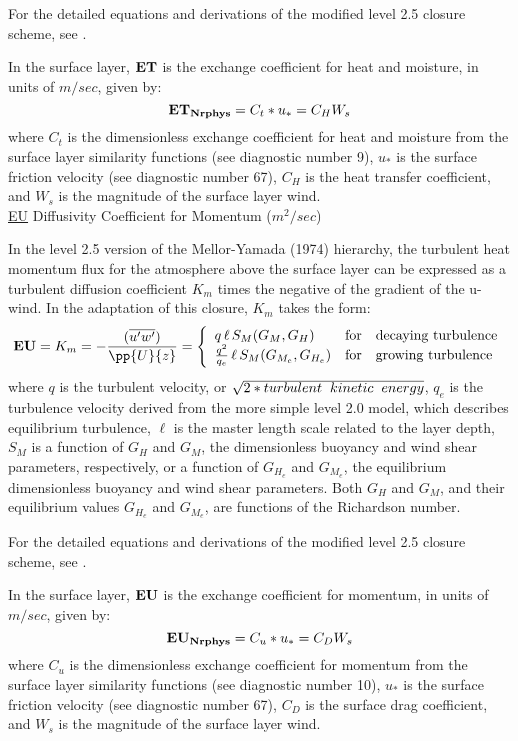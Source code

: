 \noindent
For the detailed equations and derivations of the modified level 2.5 closure scheme,
see \cite{helflab:88}.

\noindent
In the surface layer, ${\bf {ET}}$ is the exchange coefficient for heat and moisture,
in units of $m/sec$, given by:
\[
{\bf ET_{Nrphys}} =  C_t * u_* = C_H W_s
\]
\noindent
where $C_t$ is the dimensionless exchange coefficient for heat and moisture from the 
surface layer similarity functions (see diagnostic number 9), $u_*$ is the surface 
friction velocity (see diagnostic number 67), $C_H$ is the heat transfer coefficient,
and $W_s$ is the magnitude of the surface layer wind.
\\
 
\noindent
{ \underline {EU}  Diffusivity Coefficient for Momentum ($m^2/sec$) }
 
\noindent  
In the level 2.5 version of the Mellor-Yamada (1974) hierarchy, the turbulent heat
momentum flux for the atmosphere above the surface layer can be expressed as a turbulent
diffusion coefficient $K_m$ times the negative of the gradient of the u-wind.
In the \cite{helflab:88} adaptation of this closure, $K_m$
takes the form:
\[
{\bf EU} = K_m = -{( {\overline{u^{\prime}w^{\prime}}}) \over {\pp{U}{z}} }
 = \left\{ \begin{array}{l@{\quad\mbox{for}\quad}l} q \, \ell \, S_M(G_M,G_H) & \mbox{decaying turbulence}
\\ { q^2 \over {q_e} } \, \ell \, S_{M}(G_{M_e},G_{H_e}) & \mbox{growing turbulence} \end{array} \right.
\]
\noindent
where $q$ is the turbulent velocity, or $\sqrt{2*turbulent \hspace{.2cm} kinetic \hspace{.2cm}
energy}$, $q_e$ is the turbulence velocity derived from the more simple level 2.0 model,
which describes equilibrium turbulence, $\ell$ is the master length scale related to the layer
depth, 
$S_M$ is a function of $G_H$ and $G_M$, the dimensionless buoyancy and
wind shear parameters, respectively, or a function of $G_{H_e}$ and $G_{M_e}$, the equilibrium 
dimensionless buoyancy and wind shear
parameters.   Both $G_H$ and $G_M$, and their equilibrium values $G_{H_e}$ and $G_{M_e}$, 
are functions of the Richardson number.

\noindent
For the detailed equations and derivations of the modified level 2.5 closure scheme,
see \cite{helflab:88}.
 
\noindent
In the surface layer, ${\bf {EU}}$ is the exchange coefficient for momentum,
in units of $m/sec$, given by:
\[
{\bf EU_{Nrphys}} = C_u * u_* = C_D W_s
\]
\noindent
where $C_u$ is the dimensionless exchange coefficient for momentum from the surface layer 
similarity functions (see diagnostic number 10), $u_*$ is the surface friction velocity 
(see diagnostic number 67), $C_D$ is the surface drag coefficient, and $W_s$ is the 
magnitude of the surface layer wind.
\\
 
